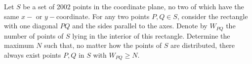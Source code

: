 Let $ S$ be a set of 2002 points in the coordinate plane, no two of which have the same $ x-$ or $ y-$coordinate. For any two points $ P,Q \in S$, consider the rectangle with one diagonal $ PQ$ and the sides parallel to the axes. Denote by $ W_{PQ}$ the number of points of $ S$ lying in the interior of this rectangle. Determine the maximum $ N$ such that, no matter how the points of $ S$ are distributed, there always exist points $ P,Q$ in $ S$ with $ W_{PQ}\ge N$.